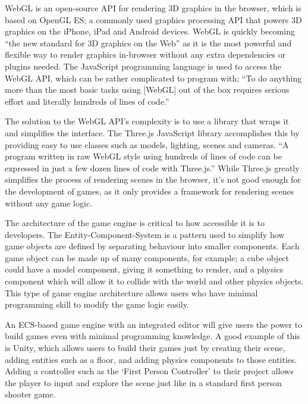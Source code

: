 \documentclass[a4paper, 12pt]{article}
\begin{document}
WebGL is an open-source API for rendering 3D graphics in the browser, which is based on OpenGL ES; a commonly used graphics processing API that powers 3D graphics on the iPhone, iPad and Android devices.\cite{parisi2012webgl} WebGL is quickly becoming ``the new standard for 3D graphics on the Web''\cite[p2]{parisi2012webgl} as it is the most powerful and flexible way to render graphics in-browser without any extra dependencies or plugins needed. The JavaScript programming language is used to access the WebGL API, which can be rather complicated to program with; ``To do anything more than the most basic tasks using [WebGL] out of the box requires serious effort and literally hundreds of lines of code.''\cite[p44]{parisi2014programming}

The solution to the WebGL API's complexity is to use a library that wraps it and simplifies the interface. The Three.js\cite{threejs} JavaScript library accomplishes this by providing easy to use classes such as models, lighting, scenes and cameras. ``A program written in raw WebGL style using hundreds of lines of code can be expressed in just a few dozen lines of code with Three.js.''\cite[p57]{parisi2014programming} While Three.js greatly simplifies the process of rendering scenes in the browser, it's not good enough for the development of games, as it only provides a framework for rendering scenes without any game logic.

The architecture of the game engine is critical to how accessible it is to developers. The Entity-Component-System is a pattern used to simplify how game objects are defined by separating behaviour into smaller components. Each game object can be made up of many components, for example; a cube object could have a model component, giving it something to render, and a physics component which will allow it to collide with the world and other physics objects.\cite{gregory2014game} This type of game engine architecture allows users who have minimal programming skill to modify the game logic easily.

An ECS-based game engine with an integrated editor will give users the power to build games even with minimal programming knowledge. A good example of this is Unity, which allows users to build their games just by creating their scene, adding entities such as a floor, and adding physics components to those entities.\cite{unitycreatingscenes} Adding a controller such as the `First Person Controller' to their project allows the player to input and explore the scene just like in a standard first person shooter game.\cite{unitycharactercontrol}
\end{document}
